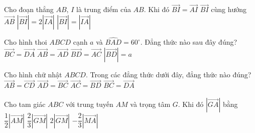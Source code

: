 \begin{ex}%
	Cho đoạn thẳng $ AB $, $ I $ là trung điểm của $ AB $. Khi đó
	\choice
	{$ \overrightarrow{BI}=\overrightarrow{AI} $}
	{$ \overrightarrow{BI} $ cùng hướng $ \overrightarrow{AB} $}
	{$ \left|\overrightarrow{BI}\right|=2\left|\overrightarrow{IA}\right| $}
	{\True $ \left|\overrightarrow{BI}\right|=\left|\overrightarrow{IA}\right| $}
\end{ex}



\begin{ex}%
	Cho hình thoi $ABCD$ cạnh $a$ và $\widehat{BAD}=60^\circ $. Đẳng thức nào sau đây đúng?
	\choice
	{$\overrightarrow{BC}=\overrightarrow{DA}$}
	{$\overrightarrow{AB}=\overrightarrow{AD}$}
	{$\overrightarrow{BD}=\overrightarrow{AC}$}
	{\True $\left| \overrightarrow{BD}\right|=a$}
\end{ex}

\begin{ex}%
	Cho hình chữ nhật $ABCD$. Trong các đẳng thức dưới đây, đẳng thức nào đúng?
	\choice
	{$\overrightarrow{AB}=\overrightarrow{CD}$}
	{\True $\overrightarrow{AD}=\overrightarrow{BC}$}
	{$\overrightarrow{AC}=\overrightarrow{BD}$}
	{$\overrightarrow{BC}=\overrightarrow{DA}$}
\end{ex}


\begin{ex}%
	Cho tam giác $ABC$ với trung tuyến $AM$ và trọng tâm $G$. Khi đó $|\overrightarrow{GA}|$ bằng
	\choice
	{$\dfrac{1}{2}|\overrightarrow{AM}|$}
	{$\dfrac{2}{3}|\overrightarrow{GM}|$}
	{\True $2|\overrightarrow{GM}|$}
	{$-\dfrac{2}{3}|\overrightarrow{MA}|$}
\end{ex}











